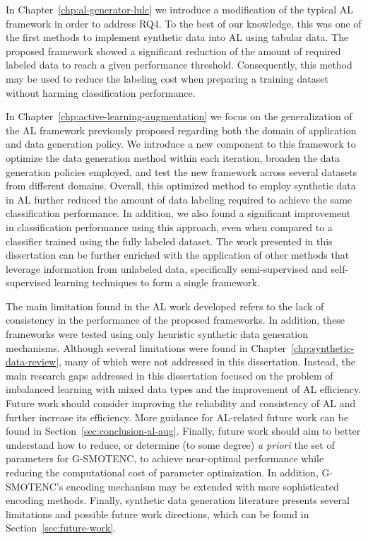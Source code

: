 In Chapter~\ref{chp:al-generator-lulc} we introduce a modification of the
typical AL framework in order to address RQ4. To the best of our knowledge,
this was one of the first methods to implement synthetic data into AL using
tabular data. The proposed framework showed a significant reduction of the
amount of required labeled data to reach a given performance threshold.
Consequently, this method may be used to reduce the labeling cost when
preparing a training dataset without harming classification performance\@.

In Chapter~\ref{chp:active-learning-augmentation} we focus on the
generalization of the AL framework previously proposed regarding both the
domain of application and data generation policy. We introduce a new component
to this framework to optimize the data generation method within each
iteration, broaden the data generation policies employed, and test the new
framework across several datasets from different domains. Overall, this
optimized method to employ synthetic data in AL further reduced the amount of
data labeling required to achieve the same classification performance. In
addition, we also found a significant improvement in classification
performance using this approach, even when compared to a classifier trained
using the fully labeled dataset. The work presented in this dissertation can
be further enriched with the application of other methods that leverage
information from unlabeled data, specifically semi-supervised and
self-supervised learning techniques to form a single framework.

The main limitation found in the AL work developed refers to the lack of
consistency in the performance of the proposed frameworks. In addition, these
frameworks were tested using only heuristic synthetic data generation
mechanisms. Although several limitations were found in
Chapter~\ref{chp:synthetic-data-review}, many of which were not addressed in
this dissertation. Instead, the main research gaps addressed in this
dissertation focused on the problem of imbalanced learning with mixed data
types and the improvement of AL efficiency. Future work should consider
improving the reliability and consistency of AL and further increase its
efficiency. More guidance for AL-related future work can be found in
Section~\ref{sec:conclusion-al-aug}. Finally, future work should aim to better
understand how to reduce, or determine (to some degree) \textit{a priori} the
set of parameters for G-SMOTENC, to achieve near-optimal performance while
reducing the computational cost of parameter optimization. In addition,
G-SMOTENC's encoding mechanism may be extended with more sophisticated
encoding methods. Finally, synthetic data generation literature presents
several limitations and possible future work directions, which can be found in
Section~\ref{sec:future-work}.

